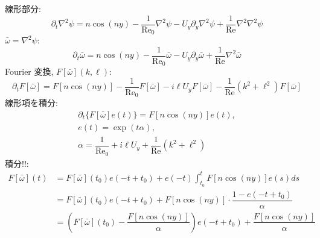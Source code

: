 \documentclass[12pt, a4j]{jsarticle}
\newcommand{\p}{\partial}
\renewcommand{\Re}{\mathrm{Re}}
\begin{document}
線形部分:
\begin{equation}
    \p_{t} \nabla^{2} \psi
    = n \cos{(n y)}
      - \dfrac{1}{\Re_{0}} \nabla^{2} \psi
      - U_{y} \p_{y} \nabla^{2} \psi
      + \dfrac{1}{\Re} \nabla^{2} \nabla^{2} \psi 
\end{equation}
$\bar{\omega} = \nabla^{2} \psi$:
\begin{equation}
    \p_{t} \bar{\omega}
    = n \cos{(n y)}
      - \dfrac{1}{\Re_{0}} \bar{\omega}
      - U_{y} \p_{y} \bar{\omega}
      + \dfrac{1}{\Re} \nabla^{2} \bar{\omega}
\end{equation}
Fourier 変換, $F[\bar{\omega}](k, \ell)$:
\begin{equation}
    \p_{t} F[\bar{\omega}]
    = F[n \cos{(n y)}]
      - \dfrac{1}{\Re_{0}} F[\bar{\omega}]
      - i \ell U_{y} F[\bar{\omega}]
      - \dfrac{1}{\Re} (k^{2} + \ell^{2}) F[\bar{\omega}]
\end{equation}
線形項を積分:
\begin{gather}
    \p_{t}\{ F[\bar{\omega}] e(t) \}
    = F[n \cos{(n y)}] e(t),
    \\
    e(t) = \exp{(t \alpha)},
    \\
    \alpha
    =
                 \dfrac{1}{\Re_{0}}
                 + i \ell U_{y}
                 + \dfrac{1}{\Re} (k^{2} + \ell^{2})
\end{gather}
積分!!:
\begin{align}
    F[\bar{\omega}](t)
    &= F[\bar{\omega}](t_{0}) e(- t + t_{0})
       + e(- t) \int_{t_{0}}^{t} F[n \cos{(n y)}]e(s) d s
    \\
    &= F[\bar{\omega}](t_{0}) e(- t + t_{0})
       + F[n \cos{(n y)}]
       \cdot \dfrac{1 - e(- t + t_{0})}{\alpha}
    \\
    &= \left(
           F[\bar{\omega}](t_{0})
           - \dfrac{F[n \cos{(n y)}]}{\alpha}
       \right) 
           e(- t + t_{0})
       + \dfrac{F[n \cos{(n y)}]}{\alpha}
\end{align}
\end{document}
